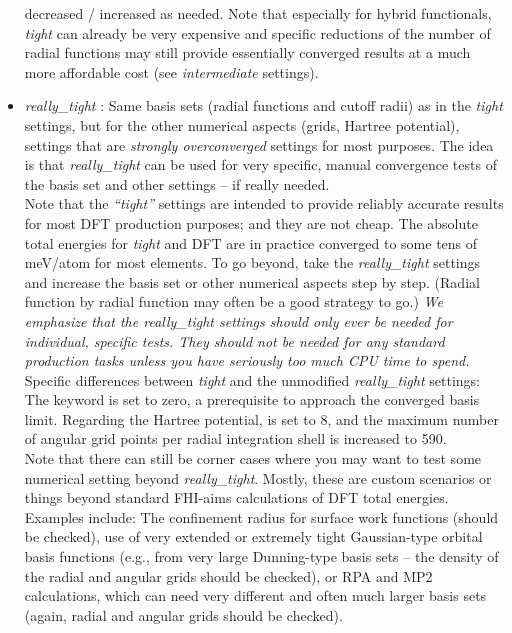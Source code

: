 \begin{itemize}
    decreased / increased as needed. Note that especially for hybrid functionals,
    \emph{tight} can already be very expensive and specific reductions
    of the number of radial functions may still provide essentially
    converged results at a much more affordable cost (see
    \emph{intermediate} settings).
  \item \emph{really\_tight} : 
    Same basis sets (radial functions and cutoff radii) as in the
    \emph{tight} settings, but for the other numerical aspects (grids,
    Hartree potential), settings that are \emph{strongly
    overconverged} settings for most purposes. The idea is that
    \emph{really\_tight} can be used for very specific, manual
    convergence tests of the basis set and other settings -- if really
    needed. \\ 
    Note that the \emph{``tight''} settings are intended to
    provide reliably accurate results for most DFT production
    purposes; and they are not cheap. The absolute total energies for
    \emph{tight} and DFT are in practice converged to some tens of
    meV/atom for most elements. To go beyond, take the
    \emph{really\_tight} settings and increase the basis set or other
    numerical aspects step by step. (Radial function by radial 
    function may often be a good strategy to go.) \emph{We emphasize
    that the \emph{really\_tight} settings should only ever be
    needed for individual, specific tests. They should not be
    needed for any standard production tasks unless you have
    seriously too much CPU time to spend.} \\ Specific differences
    between \emph{tight} 
    and the unmodified \emph{really\_tight} settings: The
     keyword is set to zero, a
    prerequisite to approach the converged basis limit. Regarding the
    Hartree potential,  is set to 8,
    and the maximum number of angular grid points per radial
    integration shell is increased to 590. \\  
    Note that there can still
    be corner cases where you may want to test some numerical setting
    beyond \emph{really\_tight}. Mostly, these are custom scenarios or
    things beyond standard FHI-aims calculations of DFT total
    energies. Examples include: The confinement radius for surface
    work functions (should be checked), use of very extended or
    extremely tight Gaussian-type orbital basis functions (e.g., from
    very large Dunning-type basis sets -- the density of the radial
    and angular grids should be checked), or RPA and MP2 calculations,
    which can need very different and often much larger basis sets
    (again, radial and angular grids should be checked). 
\end{itemize}

